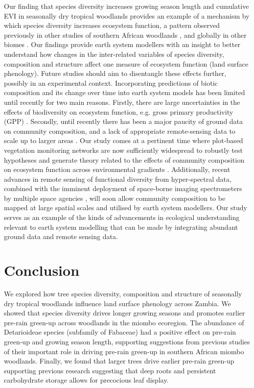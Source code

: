 \documentclass[11pt,a4paper]{article}
\begin{document}
Our finding that species diversity increases growing season length and
cumulative EVI in seasonally dry tropical woodlands provides an example of a
mechanism by which species diversity increases ecosystem function, a pattern
observed previously in other studies of southern African woodlands
\citep{Godlee2021, McNicol2018, Shirima2015}, and globally in other biomes
\citep{Plas2019, Tilman2014}. Our findings provide earth system modellers with
an insight to better understand how changes in the inter-related variables of
species diversity, composition and structure affect one measure of ecosystem
function (land surface phenology). Future studies should aim to disentangle
these effects further, possibly in an experimental context. Incorporating
predictions of biotic composition and its change over time into earth system
models has been limited until recently for two main reasons. Firstly, there are
large uncertainties in the effects of biodiversity on ecosystem function, e.g.
gross primary productivity (GPP) \citep{Ahlstrom2015}. Secondly, until recently
there has been a major paucity of ground data on community composition, and a
lack of appropriate remote-sensing data to scale up to larger areas
\citep{Bodegom2011}. Our study comes at a pertinent time where plot-based
vegetation monitoring networks are now sufficiently widespread to robustly test
hypotheses and generate theory related to the effects of community composition
on ecosystem function across environmental gradients \citep{ForestPlotsnet2021,
SEOSAW2020}. Additionally, recent advances in remote sensing of functional
diversity from hyper-spectral data, combined with the imminent deployment of
space-borne imaging spectrometers by multiple space agencies
\citep{CawseNicholson2021, Rast2021}, will soon allow community composition to
be mapped at large spatial scales \citep{Wallis2024, Cavendar2020} and utilised
by earth system modellers. Our study serves as an example of the kinds of
advancements in ecological understanding relevant to earth system modelling
that can be made by integrating abundant ground data and remote sensing data.

\section{Conclusion}

We explored how tree species diversity, composition and structure of seasonally
dry tropical woodlands influence land surface phenology across Zambia. We
showed that species diversity drives longer growing seasons and promotes
earlier pre-rain green-up across woodlands in the miombo ecoregion. The
abundance of Detarioideae species (subfamily of Fabaceae) had a positive effect
on pre-rain green-up and growing season length, supporting suggestions from
previous studies of their important role in driving pre-rain green-up in
southern African miombo woodlands. Finally, we found that larger trees drive
earlier pre-rain green-up supporting previous research suggesting that deep
roots and persistent carbohydrate storage allows for precocious leaf display.
\end{document}
